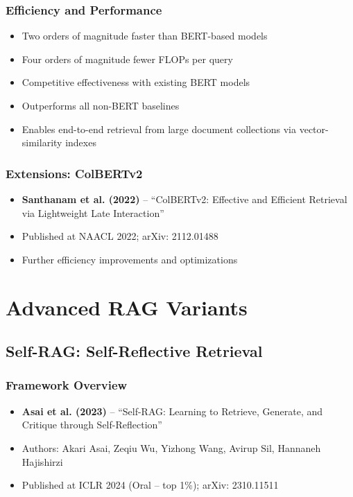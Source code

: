 \documentclass[11pt,letterpaper]{article}
\begin{document}
\subsubsection{Efficiency and Performance}
\begin{itemize}[leftmargin=*]
    \item Two orders of magnitude faster than BERT-based models
    \item Four orders of magnitude fewer FLOPs per query
    \item Competitive effectiveness with existing BERT models
    \item Outperforms all non-BERT baselines
    \item Enables end-to-end retrieval from large document collections via vector-similarity indexes
\end{itemize}

\subsubsection{Extensions: ColBERTv2}
\begin{itemize}[leftmargin=*]
    \item \textbf{Santhanam et al. (2022)} -- ``ColBERTv2: Effective and Efficient Retrieval via Lightweight Late Interaction''
    \item Published at NAACL 2022; arXiv: 2112.01488
    \item Further efficiency improvements and optimizations
\end{itemize}

\section{Advanced RAG Variants}

\subsection{Self-RAG: Self-Reflective Retrieval}

\subsubsection{Framework Overview}
\begin{itemize}[leftmargin=*]
    \item \textbf{Asai et al. (2023)} -- ``Self-RAG: Learning to Retrieve, Generate, and Critique through Self-Reflection'' \cite{asai2023selfrag}
    \item Authors: Akari Asai, Zeqiu Wu, Yizhong Wang, Avirup Sil, Hannaneh Hajishirzi
    \item Published at ICLR 2024 (Oral -- top 1\%); arXiv: 2310.11511
\end{itemize}
\end{document}
